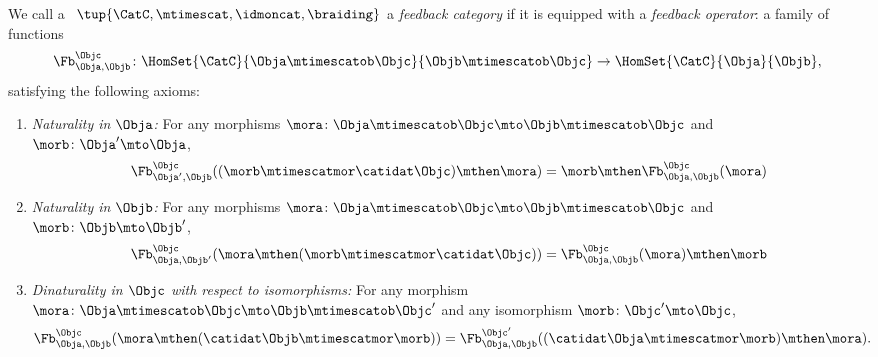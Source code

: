 \begin{ctdefinition}
    \label{def:feedback-cat}
    We call a ~$\tup{\CatC, \mtimescat, \idmoncat, \braiding}$ a \emph{feedback category} if it is equipped with a \emph{feedback operator}: a family of functions
    \begin{equation}
        \Fb_{\Obja,\Objb}^\Objc\colon \HomSet{\CatC}{\Obja \mtimescatob \Objc}{\Objb\mtimescatob \Objc}\to \HomSet{\CatC}{\Obja}{\Objb},
    \end{equation}
    satisfying the following axioms:
    \begin{enumerate}
        \item \emph{Naturality in $\Obja$:} For any morphisms $\mora\colon \Obja\mtimescatob \Objc \mto \Objb\mtimescatob \Objc$ and $\morb \colon \Obja' \mto \Obja$,
              \begin{equation}\label{eq:feedback-naturality-1}
                  \Fb_{\Obja', \Objb}^\Objc ( (\morb \mtimescatmor \catidat\Objc) \mthen \mora) = \morb \mthen \Fb_{\Obja, \Objb}^\Objc (\mora)
              \end{equation}
        \item \emph{Naturality in $\Objb$:} For any morphisms $\mora\colon \Obja\mtimescatob \Objc \mto \Objb\mtimescatob \Objc$ and $\morb \colon \Objb \mto \Objb'$,
              \begin{equation}\label{eq:feedback-naturality-2}
                  \Fb_{\Obja, \Objb'}^\Objc ( \mora \mthen (\morb \mtimescatmor \catidat\Objc) ) = \Fb_{\Obja, \Objb}^\Objc (\mora) \mthen \morb
              \end{equation}
        \item \emph{Dinaturality in $\Objc$ with respect to isomorphisms:}
              For any morphism $\mora \colon \Obja  \mtimescatob \Objc \mto \Objb \mtimescatob \Objc'$ and any isomorphism $\morb \colon \Objc' \mto \Objc$,
              \begin{equation}\label{eq:feedback-dinaturality}
                  \Fb_{\Obja, \Objb}^{\Objc} (\mora \mthen (\catidat\Objb \mtimescatmor \morb)) = \Fb_{\Obja, \Objb}^{\Objc'}((\catidat\Obja \mtimescatmor \morb) \mthen \mora).
              \end{equation}


\end{enumerate}
\end{ctdefinition}

